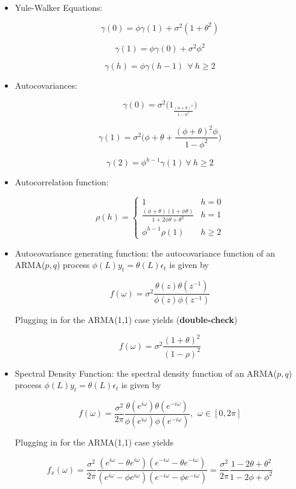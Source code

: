 \begin{itemize}

\item Yule-Walker Equations:

\[
\gamma(0) = \phi \gamma(1) + \sigma^2(1 + \theta^2)
\]

\[
\gamma(1) = \phi \gamma(0) + \sigma^2 \phi^2
\]

\[
\gamma(h) = \phi \gamma(h-1) \ \ \forall \ h \geq 2
\]

\item Autocovariances:

\[
\gamma(0) = \sigma^2 \bigg( 1 _ \frac{(\phi + \theta)^2}{1 - \phi^2} \bigg) 
\]

\[
\gamma(1) = \sigma^2 \bigg( \phi + \theta + \frac{(\phi + \theta)^2 \phi}{1 - \phi^2} \bigg)
\]

\[
\gamma(2) = \phi^{h-1} \gamma(1) \ \forall \ h \geq 2
\]

\item Autocorrelation function:

\[
\rho(h) = \begin{cases} 
      1 & h = 0 \\
      \frac{(\phi + \theta)(1 + \phi \theta)}{1 + 2 \phi\theta + \theta^2} & h = 1 \\
      \phi^{h-1} \rho(1) & h \geq 2
   \end{cases}
\]

\item Autocovariance generating function: the autocovariance function of an ARMA(\(p, q\)) process \(\phi(L)y_t = \theta(L) \epsilon_t\) is given by

\[
f(\omega) = \sigma^2 \frac{\theta(z) \theta(z^{- 1}) }{\phi(z) \phi(z^{-1})}
\]

Plugging in for the ARMA(1,1) case yields (\textbf{double-check})

\[
f(\omega) = \sigma^2 \frac{ (1+ \theta)^2 }{(1 - \rho)^2}
\]

\item Spectral Density Function: the spectral density function of an ARMA(\(p, q\)) process \(\phi(L)y_t = \theta(L) \epsilon_t\) is given by

\[
f(\omega) = \frac{\sigma^2}{2\pi} \frac{\theta(e^{i \omega}) \theta(e^{- i \omega}) }{\phi(e^{i \omega}) \phi(e^{- i \omega})}, \ \ \omega \in [0, 2\pi]
\]

Plugging in for the ARMA(1,1) case yields

\[
f_x(\omega)= \frac{\sigma^2}{2\pi} \frac{(e^{i \omega} - \theta e^{i \omega} )(e^{-i \omega} - \theta e^{-i \omega})}{(e^{i \omega} - \phi e^{i \omega} )(e^{- i \omega} - \phi e^{- i \omega} )} = \frac{\sigma^2}{2\pi} \frac{1 - 2\theta + \theta^2}{1 -2\phi + \phi^2}
\]


\end{itemize}
